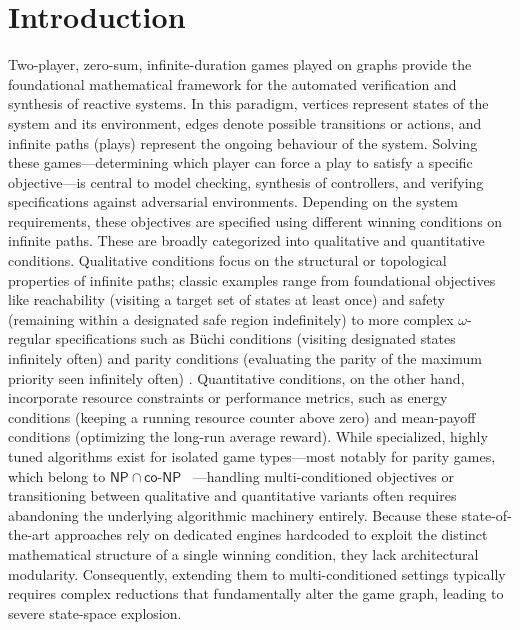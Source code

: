 \documentclass[a4paper,fleqn]{cas-sc}
\begin{document}
\newpage
\tableofcontents
\newpage

\section{Introduction}
Two-player, zero-sum, infinite-duration games played on graphs provide the foundational mathematical framework for the automated verification and synthesis of reactive systems. In this paradigm, vertices represent states of the system and its environment, edges denote possible transitions or actions, and infinite paths (plays) represent the ongoing behaviour of the system. Solving these games—determining which player can force a play to satisfy a specific objective—is central to model checking, synthesis of controllers, and verifying specifications against adversarial environments.
%
Depending on the system requirements, these objectives are specified using different winning conditions on infinite paths. These are broadly categorized into qualitative and quantitative conditions. Qualitative conditions focus on the structural or topological properties of infinite paths; classic examples range from foundational objectives like reachability (visiting a target set of states at least once) and safety (remaining within a designated safe region indefinitely) to more complex $\omega$-regular specifications such as Büchi conditions (visiting designated states infinitely often) and parity conditions (evaluating the parity of the maximum priority seen infinitely often) \cite{Chatterjee:2012,Erich:2008}. Quantitative conditions, on the other hand, incorporate resource constraints or performance metrics, such as energy conditions (keeping a running resource counter above zero) and mean-payoff conditions (optimizing the long-run average reward)\cite{ChatterjeeHJ05,Chaloupka:2011}.
%
While specialized, highly tuned algorithms exist for isolated game types—most notably for parity games, which belong to $\mathsf{NP} \cap \mathsf{co\textit{-}NP}$~\cite{Jurdziński:1998}  —handling multi-conditioned objectives or transitioning between qualitative and quantitative variants often requires abandoning the underlying algorithmic machinery entirely. Because these state-of-the-art approaches rely on dedicated engines hardcoded to exploit the distinct mathematical structure of a single winning condition, they lack architectural modularity. Consequently, extending them to multi-conditioned settings typically requires complex reductions that fundamentally alter the game graph, leading to severe state-space explosion.
%
\end{document}
